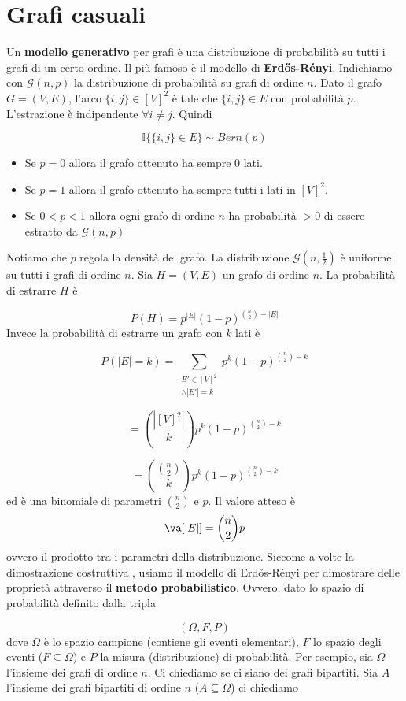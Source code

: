 \documentclass[12pt]{report}
\begin{document}
\section{Grafi casuali}
Un \textbf{modello generativo} per grafi è una distribuzione di probabilità su tutti i grafi di un certo ordine. Il più famoso è il modello di \textbf{Erd\H{o}s-Rényi}. Indichiamo con $\mathscr{G}(n,p) $ la distribuzione di probabilità su grafi di ordine $n$. Dato il grafo $G = (V,E)$, l'arco $\{i,j\} \in [V ]^2$ è tale che $\{i,j\} \in E$ con probabilità $p$. L'estrazione è indipendente  $\forall i \neq j$. Quindi 

$$\mathds{I}\{\{i,j\} \in E\} \sim Bern(p)$$
\begin{itemize}
    \item Se $p = 0$ allora il grafo ottenuto ha sempre $0$ lati.
    \item Se $p = 1$ allora il grafo ottenuto ha sempre tutti i lati in $[V]^2$.
    \item Se $0 < p < 1$ allora ogni grafo di ordine $n$ ha probabilità $> 0$ di essere estratto da $\mathscr{G}(n,p)$
\end{itemize}

\noindent
Notiamo che $p$ regola la densità del grafo.
La distribuzione $\mathscr{G}(n,\frac{1}{2})$ è uniforme su tutti i grafi di ordine $n$. 
Sia $H = (V,E)$ un grafo di ordine $n$. La probabilità di estrarre $H$ è 

$$ P(H) = p^{|E|} (1-p)^{\binom{n}{2} - |E|}$$ 
Invece la probabilità di estrarre un grafo con $k$ lati è 

$$P(|E| = k) = \sum_{\substack{ E' \in [V]^2 \\ \land |E'| = k}} p^k (1-p)^{\binom{n}{2} - k}$$

$$= \binom{|[V]^2|}{k}p^k (1-p)^{\binom{n}{2} - k}$$

$$= \binom{\binom{n}{2}}{k}p^k (1-p)^{\binom{n}{2} - k}$$
ed è una binomiale di parametri $\binom{n}{2}$ e $p$. Il valore atteso è $$\va[|E|] = \binom{n}{2}p$$ ovvero il prodotto tra i parametri della distribuzione.
Siccome a volte la dimostrazione costruttiva , usiamo il modello di Erd\H{o}s-Rényi per dimostrare delle proprietà attraverso il \textbf{metodo probabilistico}. Ovvero, dato lo spazio di probabilità definito dalla tripla

 $$(\Omega,F,P)$$
dove $\Omega$ è lo spazio campione (contiene gli eventi elementari), $F$ lo spazio degli eventi ($F \subseteq \Omega$) e $P$ la misura (distribuzione) di probabilità. Per esempio, sia $\Omega$ l'insieme dei grafi di ordine $n$. Ci chiediamo se ci siano dei grafi bipartiti.  Sia $A$ l'insieme dei grafi bipartiti di ordine $n$ ($A \subseteq \Omega $) ci chiediamo
\end{document}
